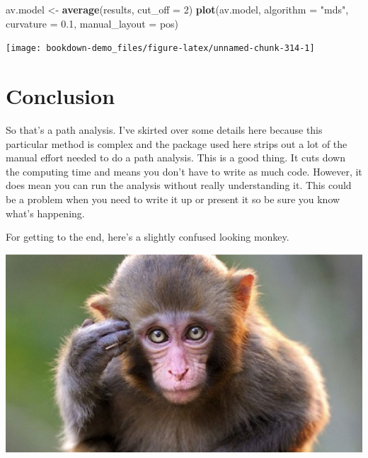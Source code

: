 \documentclass[
]{book}
\newenvironment{Shaded}{\begin{snugshade}}{\end{snugshade}}
\newcommand{\DataTypeTok}[1]{\textcolor[rgb]{0.13,0.29,0.53}{#1}}
\newcommand{\DecValTok}[1]{\textcolor[rgb]{0.00,0.00,0.81}{#1}}
\newcommand{\FloatTok}[1]{\textcolor[rgb]{0.00,0.00,0.81}{#1}}
\newcommand{\KeywordTok}[1]{\textcolor[rgb]{0.13,0.29,0.53}{\textbf{#1}}}
\newcommand{\NormalTok}[1]{#1}
\newcommand{\StringTok}[1]{\textcolor[rgb]{0.31,0.60,0.02}{#1}}
\begin{document}
\begin{Shaded}
\begin{Highlighting}[]
\NormalTok{av.model \textless{}{-}}\StringTok{ }\KeywordTok{average}\NormalTok{(results, }\DataTypeTok{cut\_off =} \DecValTok{2}\NormalTok{)}
\KeywordTok{plot}\NormalTok{(av.model, }\DataTypeTok{algorithm =} \StringTok{"mds"}\NormalTok{, }\DataTypeTok{curvature =} \FloatTok{0.1}\NormalTok{, }\DataTypeTok{manual\_layout =}\NormalTok{ pos)}
\end{Highlighting}
\end{Shaded}

\begin{center}\texttt{[image: bookdown-demo\_files/figure-latex/unnamed-chunk-314-1]} \end{center}

\hypertarget{conclusion-1}{%
\section{Conclusion}\label{conclusion-1}}

So that's a path analysis. I've skirted over some details here because this particular method is complex and the package used here strips out a lot of the manual effort needed to do a path analysis. This is a good thing. It cuts down the computing time and means you don't have to write as much code. However, it does mean you can run the analysis without really understanding it. This could be a problem when you need to write it up or present it so be sure you know what's happening.

For getting to the end, here's a slightly confused looking monkey.

\begin{center}\includegraphics[width=10.1in]{Images/monkey} \end{center}
\end{document}
